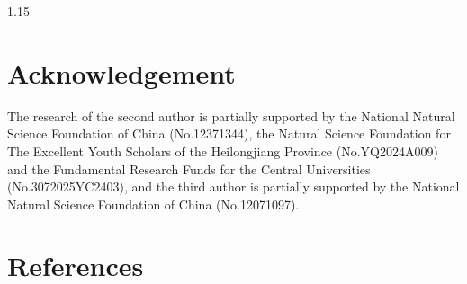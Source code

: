 \documentclass[preprint,12pt]{elsarticle1}
\numberwithin{equation}{section}
\begin{document}
\begin{spacing}{1.15}
\section*{Acknowledgement}
The research of the second author is partially
supported by the National Natural Science Foundation
 of China (No.12371344), the Natural Science Foundation
  for The Excellent Youth Scholars of the Heilongjiang Province (No.YQ2024A009) and the Fundamental Research Funds
  for the Central Universities (No.3072025YC2403),
  and the third author is partially supported by the
  National Natural Science Foundation of China
  (No.12071097).

\section*{References}%
%


\end{spacing}
\end{document}
